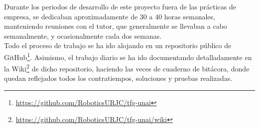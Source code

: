 Durante los periodos de desarrollo de este proyecto fuera de las prácticas de
empresa, se dedicaban aproximadamente de 30 a 40 horas semanales, manteniendo
reuniones con el tutor, que generalmente se llevaban a cabo semanalmente, y
ocasionalmente cada dos semanas.
\\

Todo el proceso de trabajo se ha ido alojando en un repositorio público de
GitHub\footnote{
\href{https://github.com/RoboticsURJC/tfg-unai}{https://github.com/RoboticsURJC/tfg-unai}}.
Asimismo, el trabajo diario se ha ido documentando detalladamente en la
Wiki\footnote{
\href{https://github.com/RoboticsURJC/tfg-unai/wiki}{https://github.com/RoboticsURJC/tfg-unai/wiki}}
de dicho repositorio, haciendo las veces de cuaderno de bitácora, donde quedan
reflejados todos los contratiempos, soluciones y pruebas realizadas.


